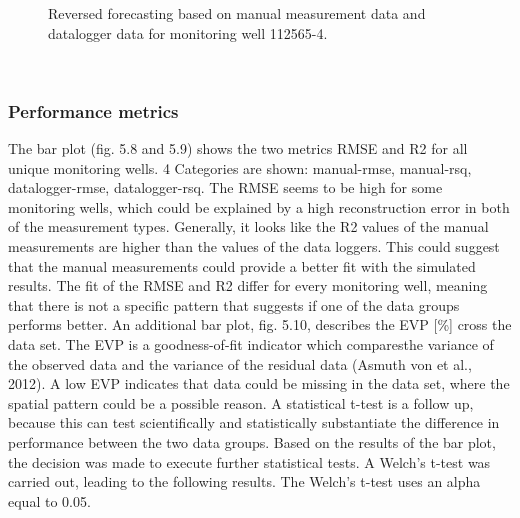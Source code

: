 \begin{figure}[htbp]
\begin{minipage}{0.32\textwidth}
        \caption{Reversed forecasting based on manual measurement data and datalogger data for monitoring well 112565-4.}
        \label{fig:112565-3}
    \end{minipage}
\end{figure} \\

\subsubsection{Performance metrics}
The bar plot (fig. 5.8 and 5.9) shows the two metrics RMSE and R2 for all unique monitoring wells. 4 Categories are shown: manual-rmse, manual-rsq, datalogger-rmse, datalogger-rsq. The RMSE seems to be high for some monitoring wells, which could be explained by a high reconstruction error in both of the measurement types. Generally, it looks like the R2 values of the manual measurements are higher than the values of the data loggers. This could suggest that the manual measurements could provide a better fit with the simulated results. The fit of the RMSE and R2 differ for every monitoring well, meaning that there is not a specific pattern that suggests if one of the data groups performs better. An additional bar plot, fig. 5.10, describes the EVP [\%] cross the data set. The EVP is a goodness-of-fit indicator which comparesthe variance of the observed data and the variance of the residual data (Asmuth von et al., 2012). A low EVP indicates that data could be missing in the data set, where the spatial pattern could be a possible reason. A statistical t-test is a follow up, because this can test scientifically and statistically substantiate the difference in performance between the two data groups.  
\newline
Based on the results of the bar plot, the decision was made to execute further statistical tests. A Welch's t-test was carried out, leading to the following results. The Welch's t-test uses an alpha equal to 0.05. 

